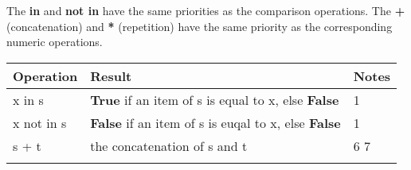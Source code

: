 \documentclass[11pt]{article}
\begin{document}
The \textbf{in} and \textbf{not in} have the same priorities as the
comparison operations. The \textbf{+} (concatenation) and \textbf{*}
(repetition) have the same priority as the corresponding numeric
operations.

\begin{longtable}[]{@{}lll@{}}
\toprule
\begin{minipage}[b]{0.14\columnwidth}\raggedright\strut
Operation\strut
\end{minipage} & \begin{minipage}[b]{0.14\columnwidth}\raggedright\strut
Result\strut
\end{minipage} & \begin{minipage}[b]{0.14\columnwidth}\raggedright\strut
Notes\strut
\end{minipage}\tabularnewline
\midrule
\endhead
\begin{minipage}[t]{0.14\columnwidth}\raggedright\strut
x in s\strut
\end{minipage} & \begin{minipage}[t]{0.14\columnwidth}\raggedright\strut
\textbf{True} if an item of s is equal to x, else \textbf{False}\strut
\end{minipage} & \begin{minipage}[t]{0.14\columnwidth}\raggedright\strut
1\strut
\end{minipage}\tabularnewline
\begin{minipage}[t]{0.14\columnwidth}\raggedright\strut
x not in s\strut
\end{minipage} & \begin{minipage}[t]{0.14\columnwidth}\raggedright\strut
\textbf{False} if an item of s is euqal to x, else \textbf{False}\strut
\end{minipage} & \begin{minipage}[t]{0.14\columnwidth}\raggedright\strut
1\strut
\end{minipage}\tabularnewline
\begin{minipage}[t]{0.14\columnwidth}\raggedright\strut
s + t\strut
\end{minipage} & \begin{minipage}[t]{0.14\columnwidth}\raggedright\strut
the concatenation of s and t\strut
\end{minipage} & \begin{minipage}[t]{0.14\columnwidth}\raggedright\strut
6 7\strut
\end{minipage}\tabularnewline
\begin{minipage}[t]{0.14\columnwidth}\raggedright\strut

\end{minipage}
\end{longtable}
\end{document}
